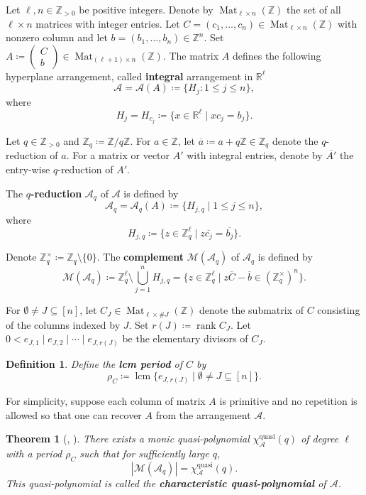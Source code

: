 \documentclass[11pt]{article}
\newtheorem{definition}[theo]{Definition}
\newtheorem{theorem}[theo]{Theorem}
\theoremstyle{definition}
\numberwithin{equation}{section}
\newcommand{\Mat}{\operatorname{Mat}}
\newcommand{\A}{\mathcal{A}}
\newcommand{\M}{\mathcal{M}}
\newcommand{\Z}{\mathbb{Z}}
\newcommand{\R}{\mathbb{R}}
\newcommand{\rk}{\operatorname{rank}}
\newcommand{\tbf}{\textbf}
\newcommand{\quasi}{\operatorname{quasi}}
\newcommand{\lcm}{\operatorname{lcm}}
\begin{document}
Let $\ell,n\in\Z_{>0}$ be positive integers. 
Denote by $\Mat_{\ell\times n}(\Z)$ the set of all $\ell\times n$ matrices with integer entries. 
Let $C=(c_1,\ldots,c_n) \in \Mat_{\ell\times n}(\Z)$ with nonzero column and let $b=(b_1,\ldots,b_n) \in\Z^n$. 
Set $A  \coloneqq  \begin{pmatrix} C\\ b\end{pmatrix}  \in \Mat_{(\ell + 1)\times n}(\Z)$. 
The matrix $A$ defines the following hyperplane arrangement, called \tbf{integral} arrangement in $\R^\ell$
$$\A=\A(A)   \coloneqq  \{ H_j : 1\le j\le n\},$$
where
$$H_j = H_{c_j}   \coloneqq  \{x\in \R^\ell\mid xc_j=b_j\}.$$

Let $q\in\Z_{>0}$ and $\Z_q  \coloneqq \Z/q\Z$. 
 For $a \in \Z$, let $\overline{a}  \coloneqq  a + q\Z \in \Z_q$ denote the $q$-reduction of $a$. 
For a matrix or vector $A'$ with integral entries, denote by $\overline{A'}$ the entry-wise $q$-reduction of $A'$.

The \tbf{$q$-reduction} $\A_q$ of $\A$ is defined by 
$$\A_q =\A_q (A) \coloneqq  \{ H_{j,q} \mid 1\le j\le n\},$$
where
$$H_{j,q}  \coloneqq  \{ z \in \Z_q^\ell \mid z\overline{c_j} =\overline{b_j}\}.$$

Denote $\Z_q^{\times} \coloneqq \Z_q \setminus \{0\}$.
The \tbf{complement} $\M(\A_q)$ of $\A_q$ is defined by 
$$\M(\A_q)  \coloneqq  \Z_q^\ell \setminus\bigcup_{j=1}^n H_{j,q} = \{z\in \Z_q^\ell \mid z\overline{C} -\overline{b} \in (\Z_q^{\times})^n\}.$$

For $\emptyset \ne J \subseteq [n]$, let $C_J \in \Mat_{\ell\times \#J}(\Z)$ denote the submatrix of $C$ consisting of the columns indexed by $J$.
Set $r(J) \coloneqq \rk C_J$.
Let $0<e_{J,1} \mid e_{J,2} \mid \cdots \mid e_{J,r(J)}$ be the elementary divisors of $C_J$.

\begin{definition}
\label{def:lcm}
Define the \tbf{lcm period} of $C$ by
$$\rho_C \coloneqq  \lcm \{e_{J,r(J)} \mid \emptyset \ne J \subseteq [n]\}.$$
\end{definition}

For simplicity, suppose each column of matrix $A$ is primitive and no repetition is allowed so that one can recover $A$ from the arrangement $\A$.


\begin{theorem}[{\cite[Theorem 2.4]{KTT08}, \cite[Theorem 3.1]{KTT11}}]
\label{thm:KTT}
There exists a monic quasi-polynomial $\chi^{\quasi}_{\A}(q)$ of degree $\ell$ with a period $\rho_{C}$ such that  for sufficiently large $q$,
$$|\M(\A_q) | = \chi^{\quasi}_{\A}(q).$$ 
This quasi-polynomial is called the \tbf{characteristic quasi-polynomial} of $\A$. 
\end{theorem}
\end{document}
